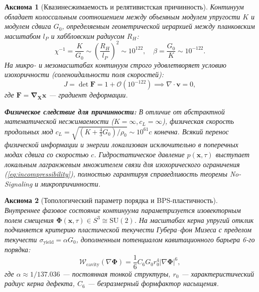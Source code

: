\documentclass[12pt,a4paper]{article}
\newtheorem{axiom}{Аксиома}
\theoremstyle{definition}
\theoremstyle{remark}
\begin{document}
\begin{axiom}[Квазинесжимаемость и релятивистская причинность]
	Континуум обладает колоссальным соотношением между объемным модулем упругости $K$ и модулем сдвига $G_0$, определяемым геометрической иерархией между планковским масштабом $l_P$ и хаббловским радиусом $R_H$:
	\begin{equation}
		\chi^{-1} = \frac{K}{G_0} \sim \left(\frac{R_H}{l_P}\right)^2 \sim 10^{122}, \quad \beta = \frac{G_0}{K} \sim 10^{-122}.
		\label{eq:compressibility_ratio}
	\end{equation}
	На микро- и мезомасштабах континуум строго удовлетворяет условию изохоричности (соленоидальности поля скоростей):
	\begin{equation}
		J = \det \mathbf{F} = 1 + \mathcal{O}(10^{-122}) \implies \nabla \cdot \mathbf{v} = 0,
		\label{eq:incompressibility}
	\end{equation}
	где $\mathbf{F} = \boldsymbol{\nabla}_{\mathbf{X}} \mathbf{x}$ --- градиент деформации.
	
	\textbf{Физическое следствие для причинности:} В отличие от абстрактной математической несжимаемости ($K=\infty, c_L=\infty$), физическая скорость продольных мод $c_L = \sqrt{(K + \frac{4}{3}G_0)/\rho_0} \sim 10^{61} c$ конечна. Всякий перенос физической информации и энергии локализован исключительно в поперечных модах сдвига со скоростью $c$. Гидростатическое давление $p(\mathbf{x}, \tau)$ выступает локальным лагранжевым множителем связи для изохорического ограничения (\ref{eq:incompressibility}), полностью гарантируя справедливость теоремы No-Signaling и микропричинности.
\end{axiom}

\begin{axiom}[Топологический параметр порядка и BPS-пластичность]
	Внутреннее фазовое состояние континуума параметризуется изовекторным полем смещения $\boldsymbol{\Phi}(\mathbf{x}, \tau) \in S^3 \cong \mathrm{SU}(2)$. На масштабах керна упругий отклик подчиняется критерию пластической текучести Губера--фон Мизеса с пределом текучести $\sigma_{\mathrm{yield}} = \alpha G_0$, дополненным потенциалом кавитационного барьера 6-го порядка:
	\begin{equation}
		\mathcal{W}_{\mathrm{cavity}}(\nabla \boldsymbol{\Phi}) = \frac{1}{6} C_6 G_0 r_0^4 |\nabla \boldsymbol{\Phi}|^6,
		\label{eq:cavitation_potential}
	\end{equation}
	где $\alpha \approx 1/137.036$ --- постоянная тонкой структуры, $r_0$ --- характеристический радиус керна дефекта, $C_6$ --- безразмерный формфактор насыщения.
\end{axiom}
\end{document}
